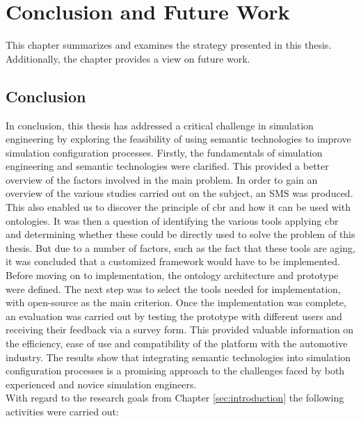 \section{Conclusion and Future Work\label{sec:conclusion}}

This chapter summarizes and examines the strategy presented in this thesis. Additionally, the chapter provides a view on future work.

\subsection{Conclusion}

In conclusion, this thesis has addressed a critical challenge in simulation engineering by exploring the feasibility of using semantic technologies to improve simulation configuration processes. Firstly, the fundamentals of simulation engineering and semantic technologies were clarified. This provided a better overview of the factors involved in the main problem. In order to gain an overview of the various studies carried out on the subject, an SMS was produced. This also enabled us to discover the principle of \acrshort{cbr} and how it can be used with ontologies. It was then a question of identifying the various tools applying \acrshort{cbr} and determining whether these could be directly used to solve the problem of this thesis. But due to a number of factors, such as the fact that these tools are aging, it was concluded that a customized framework would have to be implemented. Before moving on to implementation, the ontology architecture and prototype were defined. The next step was to select the tools needed for implementation, with open-source as the main criterion. Once the implementation was complete, an evaluation was carried out by testing the prototype with different users and receiving their feedback via a survey form. This provided valuable information on the efficiency, ease of use and compatibility of the platform with the automotive industry. The results show that integrating semantic technologies into simulation configuration processes is a promising approach to the challenges faced by both experienced and novice simulation engineers.\\

With regard to the research goals from Chapter \ref{sec:introduction} the following activities
were carried out:

